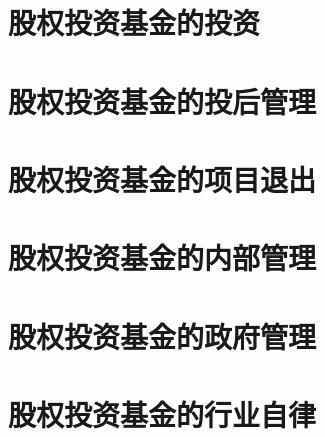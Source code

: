 \documentclass[UTF8,12pt]{ctexbook}
\numberwithin{equation}{section} %
\numberwithin{figure}{section}
\numberwithin{table}{section}
\begin{document}
	\section{股权投资基金的投资}
	
	\section{股权投资基金的投后管理}
	
	\section{股权投资基金的项目退出}
	
	\section{股权投资基金的内部管理}
	
	\section{股权投资基金的政府管理}
	
	\section{股权投资基金的行业自律}
	
	
	
	
\end{document}
